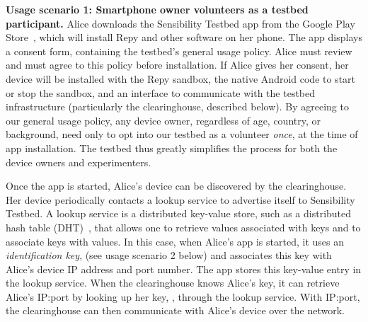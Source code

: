 \textbf{Usage scenario 1: Smartphone owner volunteers as a testbed participant.}
Alice downloads the Sensibility Testbed app from the Google Play 
Store~\cite{sensibility-app}, which will install Repy and other software on her phone.
The app displays a consent form,  containing the testbed's 
general usage policy. Alice must review and must agree to this 
policy before installation. If Alice gives her consent, her device will be 
installed with the Repy sandbox, the native Android code to 
start or stop the sandbox, and an interface to communicate with the testbed 
infrastructure (particularly the clearinghouse, described below). 
By agreeing to our general usage policy, any device 
owner, regardless of age, country, or background, need only to opt into our testbed as a
volunteer \textit{once}, at the time of app installation. 
The testbed thus greatly simplifies the process for both the 
device owners and experimenters. 

Once the app is started, Alice's device can be
discovered by the clearinghouse. Her device periodically contacts 
a lookup service to advertise itself to Sensibility Testbed. 
A lookup service is a distributed key-value store, such as a 
distributed hash table (DHT)~\cite{dht}, that 
allows one to retrieve values associated with keys and to associate 
keys with values. In this case, when Alice's app is started, it uses
an \textit{identification key},  (see usage scenario 2 
below) and associates this key with Alice's device IP address and 
port number. The app stores this key-value entry in the lookup service. 
When the clearinghouse knows Alice's key, it can retrieve Alice's 
IP:port by looking up her key, , through 
the lookup service. With IP:port, the clearinghouse can then
communicate with Alice's device over the network.

